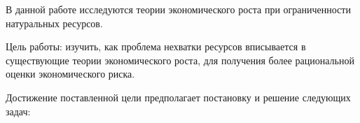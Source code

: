 \documentclass[12pt,a4paper, oneside]{extreport}
\begin{document}
В данной работе исследуются  теории экономического  роста при ограниченности натуральных ресурсов. 


Цель работы: изучить, как проблема нехватки ресурсов 
вписывается в существующие теории экономического  роста,  для  получения более рациональной  оценки  экономического риска.






Достижение поставленной цели предполагает постановку и решение следующих задач:
\end{document}
